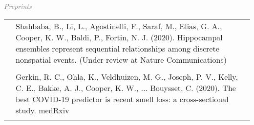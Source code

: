 \documentclass[11pt]{cooperCV_v1/cooperCV} %
\begin{document}



%


\selectfont


\begin{minipage}{\textwidth}







   
  \textcolor{gray}{{\emph{Preprints}}} 
  
   
    \begin{tabular}{ p{} %
                     p{} 
                     p{}} %
    
      \small\textcolor{gray}{{\emph{  }}} & {Shahbaba, B., Li, L., Agostinelli, F., Saraf, M., Elias, G. A., Cooper, K. W., Baldi, P.,  Fortin, N. J. (2020). Hippocampal ensembles represent sequential relationships among discrete nonspatial events. (Under review at Nature Communications) } & {\hfill \small{ }} \\ \\
    
      \small\textcolor{gray}{{\emph{  }}} & {Gerkin, R. C., Ohla, K., Veldhuizen, M. G., Joseph, P. V., Kelly, C. E., Bakke, A. J.,  Cooper, K. W., ... Bouysset, C. (2020). The best COVID-19 predictor is recent smell loss: a cross-sectional study. medRxiv} & {\hfill \small{ }} \\ \\
     

\end{tabular}
\end{minipage}
\end{document}
